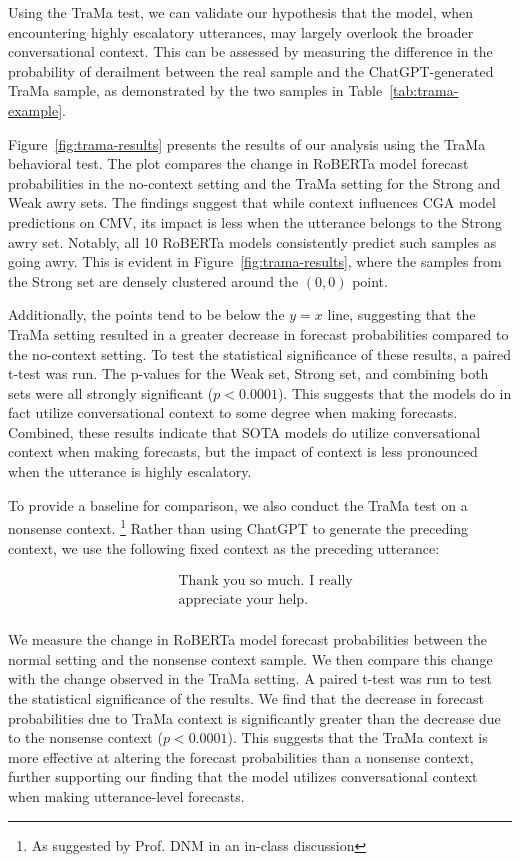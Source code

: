 Using the TraMa test, we can validate our hypothesis that the model, when encountering highly escalatory utterances, may largely overlook the broader conversational context. This can be assessed by measuring the difference in the probability of derailment between the real sample and the ChatGPT-generated TraMa sample, as demonstrated by the two samples in Table~\ref{tab:trama-example}. 

Figure~\ref{fig:trama-results} presents the results of our analysis using the TraMa behavioral test. 
The plot compares the change in RoBERTa model forecast probabilities in the no-context setting and the TraMa setting for the Strong and Weak awry sets.
The findings suggest that while context influences CGA model predictions on CMV, its impact is less when the utterance belongs to the Strong awry set. 
Notably, all 10 RoBERTa models consistently predict such samples as going awry. 
This is evident in Figure~\ref{fig:trama-results}, where the samples from the Strong set are densely clustered around the $(0, 0)$ point. 

Additionally, the points tend to be below the $y=x$ line, suggesting that the TraMa setting resulted in a greater decrease in forecast probabilities compared to the no-context setting. 
To test the statistical significance of these results, a paired t-test was run.
The p-values for the Weak set, Strong set, and combining both sets were all strongly significant ($p < 0.0001$). 
This suggests that the models do in fact utilize conversational context to some degree when making forecasts. 
Combined, these results indicate that SOTA models do utilize conversational context when making forecasts, but the impact of context is less pronounced when the utterance is highly escalatory.

{\color{blue}
To provide a baseline for comparison, we also conduct the TraMa test on a nonsense context.
\footnote{As suggested by Prof. DNM in an in-class discussion}
Rather than using ChatGPT to generate the preceding context, we use the following fixed context as the preceding utterance: 

{\ttfamily
\begin{align*}
& \text{Thank you so much. I really}\\
& \text{appreciate your help.}\\
\end{align*}
}

We measure the change in RoBERTa model forecast probabilities between the normal setting and the nonsense context sample.
We then compare this change with the change observed in the TraMa setting. 
A paired t-test was run to test the statistical significance of the results.
We find that the decrease in forecast probabilities due to TraMa context is significantly greater than the decrease due to the nonsense context ($p < 0.0001$).
This suggests that the TraMa context is more effective at altering the forecast probabilities than a nonsense context, further supporting our finding that the model utilizes conversational context when making utterance-level forecasts.
}

